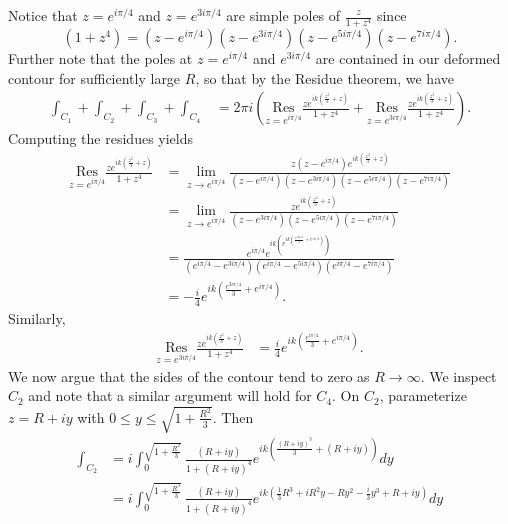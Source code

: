 \documentclass{article}
\newcommand{\res}[1]{\underset{z = #1}{\text{Res}}}
\begin{document}
\begin{itemize}
\begin{itemize}
        Notice that $z = e^{i\pi/4}$ and $z = e^{3i\pi/4}$ are simple poles of $\frac{z}{1 + z^4}$ since
        \[(1 + z^4) = (z - e^{i\pi/4})(z - e^{3i\pi/4})(z - e^{5i\pi/4})(z - e^{7i\pi/4}).\]
        Further note that the poles at $z = e^{i\pi/4}$ and $e^{3i\pi/4}$ are contained in our deformed contour for sufficiently large $R$, so that by the Residue theorem, we have
        \begin{align*}
            \int_{C_1} + \int_{C_2} + \int_{C_3} + \int_{C_4} &= 2\pi i\left(\res{e^{i\pi/4}}\frac{ze^{ik\left(\tfrac{z^3}{3} + z\right)}}{1 + z^4} + \res{e^{3i\pi/4}}\frac{ze^{ik\left(\tfrac{z^3}{3} + z\right)}}{1 + z^4}\right).
        \end{align*}
        Computing the residues yields
        \begin{align*}
            \res{e^{i\pi/4}}\frac{ze^{ik\left(\frac{z^3}{3} + z\right)}}{1 + z^4} &= \lim_{z \to e^{i\pi/4}}\frac{z(z - e^{i\pi/4})e^{ik\left(\frac{z^3}{3} + z\right)}}{(z - e^{i\pi/4})(z - e^{3i\pi/4})(z - e^{5i\pi/4})(z - e^{7i\pi/4})}\\
            &= \lim_{z \to e^{i\pi/4}}\frac{ze^{ik\left(\frac{z^3}{3} + z\right)}}{(z - e^{3i\pi/4})(z - e^{5i\pi/4})(z - e^{7i\pi/4})}\\
            &= \frac{e^{i\pi/4}e^{ik\left(e^{ik\left(\frac{e^{3i\pi/4}}{3} + e^{i\pi/4}\right)}\right)}}{(e^{i\pi/4} - e^{3i\pi/4})(e^{i\pi/4} - e^{5i\pi/4})(e^{i\pi/4} - e^{7i\pi/4})}\\
            &= -\frac{i}{4}e^{ik\left(\frac{e^{3i\pi/4}}{3} + e^{i\pi/4}\right)}.
        \end{align*}
        Similarly,
        \begin{align*}
            \res{e^{3i\pi/4}}\frac{ze^{ik\left(\frac{z^3}{3} + z\right)}}{1 + z^4} &= \frac{i}{4}e^{ik\left(\frac{e^{i\pi/4}}{3} + e^{i\pi/4}\right)}.
        \end{align*}
        We now argue that the sides of the contour tend to zero as $R \to \infty$. We inspect $C_2$ and note that a similar argument will hold for $C_4$. On $C_2$, parameterize $z = R + iy$ with $0\leq y \leq \sqrt{1 + \frac{R^2}{3}}$. Then
        \begin{align*}
            \int_{C_2} &= i\int_{0}^{\sqrt{1 + \frac{R^2}{3}}}\frac{(R + iy)}{1 + (R + iy)^4}e^{ik\left(\frac{(R + iy)^3}{3} + (R + iy)\right)}dy\\
            &= i\int_0^{\sqrt{1 + \frac{R^3}{3}}} \frac{(R + iy)}{1 + (R + iy)^4}e^{ik\left(\tfrac{1}{3}R^3 + iR^2y - Ry^2 - \tfrac{i}{3}y^3 + R + iy\right)}dy\\

\end{align*}
\end{itemize}
\end{itemize}
\end{document}
